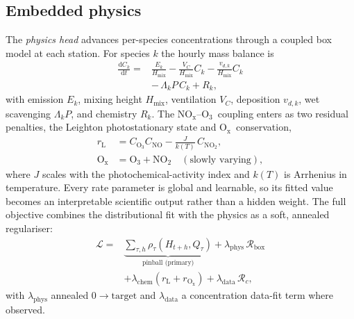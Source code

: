 \documentclass[conference]{IEEEtran}
\newcommand{\nox}{\ensuremath{\mathrm{NO_x}}}
\newcommand{\othree}{\ensuremath{\mathrm{O_3}}}
\newcommand{\notwo}{\ensuremath{\mathrm{NO_2}}}
\newcommand{\ox}{\ensuremath{\mathrm{O_x}}}
\begin{document}
\subsection{Embedded physics}
The \emph{physics head} advances per-species concentrations through a coupled box model
at each station. For species $k$ the hourly mass balance is
\begin{equation}
\begin{aligned}
\frac{\mathrm{d}C_k}{\mathrm{d}t}={}&\frac{E_k}{H_{\mathrm{mix}}}
-\frac{V_C}{H_{\mathrm{mix}}}C_k-\frac{v_{d,k}}{H_{\mathrm{mix}}}C_k\\
&-\,\Lambda_k P\,C_k+R_k,
\end{aligned}
\label{eq:box}
\end{equation}
with emission $E_k$, mixing height $H_{\mathrm{mix}}$, ventilation $V_C$, deposition
$v_{d,k}$, wet scavenging $\Lambda_k P$, and chemistry $R_k$. The \nox--\othree\ coupling
enters as two residual penalties, the Leighton photostationary state and \ox\ conservation,
\begin{equation}
\begin{aligned}
r_{\mathrm{L}}&=C_{\othree}C_{\mathrm{NO}}-\tfrac{J}{k(T)}\,C_{\notwo},\\
\ox&=\othree+\notwo\quad(\text{slowly varying}),
\end{aligned}
\label{eq:chem}
\end{equation}
where $J$ scales with the photochemical-activity index and $k(T)$ is Arrhenius in temperature. Every
rate parameter is global and learnable, so its fitted value becomes an interpretable scientific output
rather than a hidden weight. The full objective combines the distributional fit with the physics as a
soft, annealed regulariser:
\begin{equation}
\begin{aligned}
\mathcal{L}={}&\underbrace{\textstyle\sum_{\tau,h}\rho_\tau(H_{t+h},Q_\tau)}_{\text{pinball (primary)}}
+\lambda_{\mathrm{phys}}\,\mathcal{R}_{\mathrm{box}}\\
&+\lambda_{\mathrm{chem}}(r_{\mathrm{L}}+r_{\ox})+\lambda_{\mathrm{data}}\,\mathcal{R}_{c},
\end{aligned}
\label{eq:loss}
\end{equation}
with $\lambda_{\mathrm{phys}}$ annealed $0\!\rightarrow\!\text{target}$ and
$\lambda_{\mathrm{data}}$ a concentration data-fit term where observed.

\end{document}
